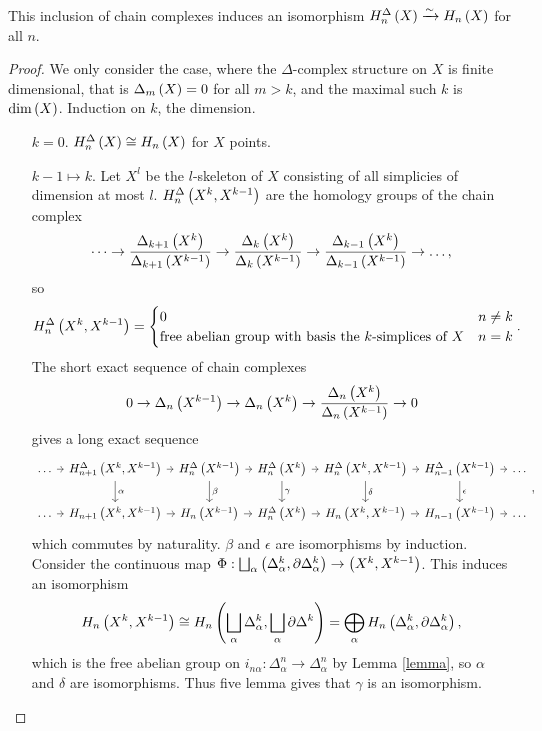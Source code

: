 \begin{theorem}
This inclusion of chain complexes induces an isomorphism $ H_n^\Delta\left( X \right) \xrightarrow{\sim} H_n\left( X \right) $ for all $ n $.
\end{theorem}

\begin{proof}
We only consider the case, where the $ \Delta $-complex structure on $ X $ is finite dimensional, that is $ \Delta_m\left( X \right) = 0 $ for all $ m > k $, and the maximal such $ k $ is $ \dim\left( X \right) $. Induction on $ k $, the dimension.
\begin{itemize}[leftmargin=2cm]
\item[$ k = 0 $.] $ H_n^\Delta\left( X \right) \cong H_n\left( X \right) $ for $ X $ points.
\item[$ k - 1 \mapsto k $.] Let $ X^l $ be the $ l $-skeleton of $ X $ consisting of all simplicies of dimension at most $ l $. $ H_n^\Delta\left( X^k, X^{k - 1} \right) $ are the homology groups of the chain complex
$$ \dots \to \dfrac{\Delta_{k + 1}\left( X^k \right)}{\Delta_{k + 1}\left( X^{k - 1} \right)} \to \dfrac{\Delta_k\left( X^k \right)}{\Delta_k\left( X^{k - 1} \right)} \to \dfrac{\Delta_{k - 1}\left( X^k \right)}{\Delta_{k - 1}\left( X^{k - 1} \right)} \to \dots, $$
so
$$ H_n^\Delta\left( X^k, X^{k - 1} \right) =
\begin{cases}
0 & n \ne k \\
\text{free abelian group with basis the $ k $-simplices of} \ X & n = k
\end{cases}.
$$
The short exact sequence of chain complexes
$$ 0 \to \Delta_n\left( X^{k - 1} \right) \to \Delta_n\left( X^k \right) \to \dfrac{\Delta_n\left( X^k \right)}{\Delta_n\left( X^{k - 1} \right)} \to 0 $$
gives a long exact sequence
$$
\begin{tikzcd}[column sep=tiny]
\dots \arrow{r} & H_{n + 1}^\Delta\rb{X^k, X^{k - 1}} \arrow{r} \arrow{d}{\alpha} & H_n^\Delta\rb{X^{k - 1}} \arrow{r} \arrow{d}{\beta} & H_n^\Delta\rb{X^k} \arrow{r} \arrow{d}{\gamma} & H_n^\Delta\rb{X^k, X^{k - 1}} \arrow{r} \arrow{d}{\delta} & H_{n - 1}^\Delta\rb{X^{k - 1}} \arrow{d}{\epsilon} \arrow{r} & \dots \\
\dots \arrow{r} & H_{n + 1}\rb{X^k, X^{k - 1}} \arrow{r} & H_n\rb{X^{k - 1}} \arrow{r} & H_n^\Delta\rb{X^k} \arrow{r} & H_n\rb{X^k, X^{k - 1}} \arrow{r} & H_{n - 1}\rb{X^{k - 1}} \arrow{r} & \dots
\end{tikzcd},
$$
which commutes by naturality. $ \beta $ and $ \epsilon $ are isomorphisms by induction. Consider the continuous map $ \Phi : \bigsqcup_\alpha \left( \Delta_\alpha^k, \partial\Delta_\alpha^k \right) \to \left( X^k, X^{k - 1} \right) $. This induces an isomorphism
$$ H_n\left( X^k, X^{k - 1} \right) \cong H_n\left( \bigsqcup_\alpha \Delta_\alpha^k, \bigsqcup_\alpha \partial\Delta^k \right) = \bigoplus_\alpha H_n\left( \Delta_\alpha^k, \partial\Delta_\alpha^k \right), $$
which is the free abelian group on $ i_{n\alpha} : \Delta_\alpha^n \to \Delta_\alpha^n $ by Lemma \ref{lemma}, so $ \alpha $ and $ \delta $ are isomorphisms. Thus five lemma gives that $ \gamma $ is an isomorphism.
\end{itemize}
\end{proof}


